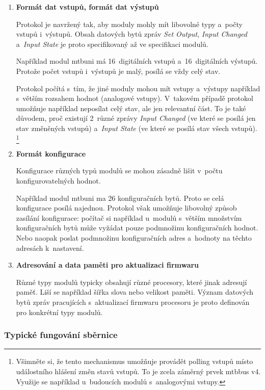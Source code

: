 \begin{enumerate}
\item \textbf{Formát dat vstupů, formát dat výstupů}

Protokol je navržený tak, aby moduly mohly mít libovolné typy a~počty vstupů
i~výstupů. Obsah datových bytů zpráv \textit{Set Output}, \textit{Input
Changed} a~\textit{Input State} je proto specifikovaný až ve specifikaci modulů.

Například modul \gls{mtbuni} má 16~digitálních vstupů a~16~digitálních výstupů.
Protože počet vstupů i~výstupů je malý, posílá se vždy celý stav.

Protokol počítá s~tím, že jiné moduly mohou mít vstupy a~výstupy například
s~větším rozsahem hodnot (analogové vstupy). V~takovém případě protokol
umožňuje například neposílat celý stav, ale jen relevantní část. To je také
důvodem, proč existují 2~různé zprávy
\textit{Input Changed} (ve které se posílá jen stav změněných vstupů)
a~\textit{Input State} (ve které se posílá stav všech vstupů).
\footnote{Všimněte si, že tento mechanismus umožňuje provádět polling
vstupů místo událostního hlášení změn stavů vstupů. To je zcela záměrný prvek
\gls{mtbbus} v4. Využije se například u~budoucích modulů s~analogovými vstupy.}

\item \textbf{Formát konfigurace}

Konfigurace různých typů modulů se mohou zásadně lišit v~počtu
konfigurovatelných hodnot.

Například modul \gls{mtbuni} ma 26 konfiguračních bytů. Proto se celá
konfigurace posílá najednou. Protokol však umožňuje libovolný způsob
zasílání konfigurace: počítač si například u~modulů s~větším množstvím konfiguračních
bytů může vyžádat pouze podmnožinu konfiguračních hodnot. Nebo naopak poslat
podmnožinu konfiguračních adres a~hodnoty na těchto adresách k~nastavení.

\item \textbf{Adresování a data paměti pro aktualizaci firmwaru}

Různé typy modulů typicky obsahují různé procesory, které jinak adresují paměť.
Liší se například šířka slova nebo velikost paměti. Význam datových bytů
zpráv pracujících s~aktualizací firmwaru procesoru je proto definován pro
konkrétní typy modulů.

\end{enumerate}

\subsubsection{Typické fungování sběrnice}

